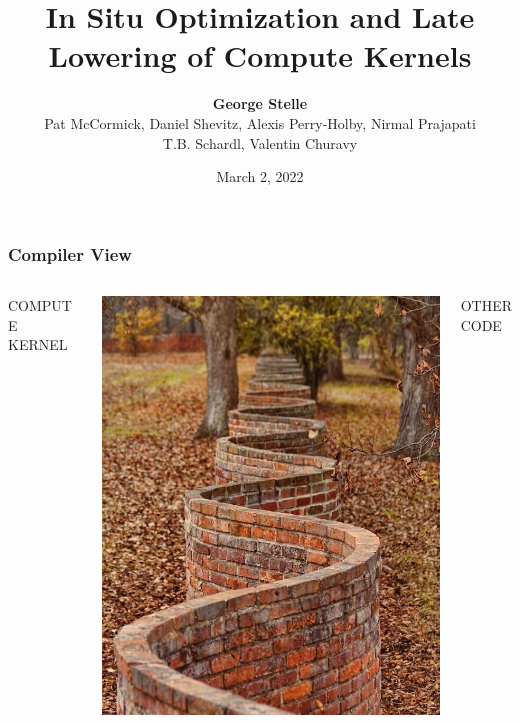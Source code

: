 \documentclass[usenames,dvipsnames]{beamer}
\title{In Situ Optimization and Late Lowering of Compute Kernels}
\date{March 2, 2022}
\author[shortname]{\textbf{George Stelle} \\ Pat McCormick, Daniel Shevitz,
Alexis Perry-Holby, Nirmal Prajapati \\ T.B. Schardl, Valentin Churavy}
\institute[shortinst]{Los Alamos National Laboratory}
\begin{document}
\begin{frame}
\maketitle
\end{frame}

\begin{frame}[fragile]
\frametitle{Compiler View}
\begin{columns}
\begin{column}{0.3\textwidth}
\begin{center}
COMPUTE KERNEL 
\end{center}
\end{column}
\begin{column}{0.3\textwidth}
\begin{center}
\includegraphics[width=\textwidth]{wall.jpg}
\end{center}
\end{column}
\begin{column}{0.3\textwidth}
\begin{center}
OTHER CODE
\end{center}
\end{column}
\end{columns}
\end{frame}
\end{document}
